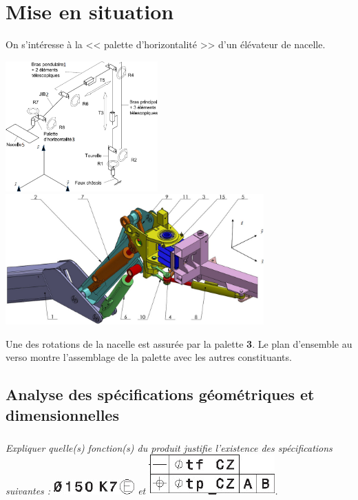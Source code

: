 \documentclass[10pt,fleqn]{article} %
\begin{document}

\vspace{5.5cm}
\pagestyle{fancy}
\thispagestyle{plain}


\def\columnseprulecolor{\color{ocre}}
\setlength{\columnseprule}{0.4pt} 

\section*{Mise en situation}
\ifprof
\else
\fi

On s'intéresse à la << palette d'horizontalité >> d'un élévateur de nacelle. 

\begin{center}
\includegraphics[height=5cm]{images/fig_01}
\includegraphics[height=5cm]{images/fig_02}
\end{center}

Une des rotations de la nacelle est assurée par la palette \textbf{3}.
Le plan d'ensemble au verso montre l'assemblage de la palette avec les autres constituants. 

\subsection*{Analyse des spécifications géométriques et dimensionnelles}
\subparagraph{}
\textit{Expliquer quelle(s) fonction(s) du produit justifie l'existence des spécifications suivantes :
\includegraphics{images/gps_01} et \includegraphics{images/gps_02}.}
\end{document}
